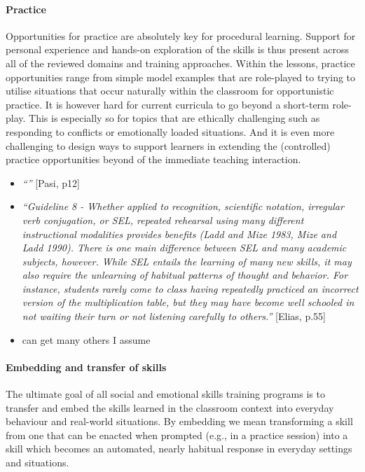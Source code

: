 \documentclass[prodmode,acmtochi]{acmsmall}
\newcommand{\qq}[2]{\textrm{\textit{``#2''}}{ [#1]}}
\begin{document}
\paragraph{Practice} Opportunities for practice are absolutely key for procedural learning. Support for personal experience and hands-on exploration of the skills is thus present across all of the reviewed domains and training approaches. Within the lessons, practice opportunities range from simple model examples that are role-played to trying to utilise situations that occur naturally within the classroom for opportunistic practice. It is however hard for current curricula to go beyond a short-term role-play. This is especially so for topics that are ethically challenging such as responding to conflicts or emotionally loaded situations. And it is even more challenging to design ways to support learners in extending the (controlled) practice opportunities beyond of the immediate teaching interaction.
\begin{itemize}
	\item \qq{Pasi, p12}{}
	\item \qq{Elias, p.55}{Guideline 8 - Whether applied to recognition, scientific notation, irregular verb conjugation, or SEL, repeated rehearsal using many different instructional modalities provides benefits (Ladd and Mize 1983, Mize and Ladd 1990). There is one main difference between SEL and many academic subjects, however. While SEL entails the learning of many new skills, it may also require the unlearning of habitual patterns of thought and behavior. For instance, students rarely come to class having repeatedly practiced an incorrect version of the multiplication table, but they may have become well schooled in not waiting their turn or not listening carefully to others.}
	\item can get many others I assume 
\end{itemize}

         
\paragraph{Embedding and transfer of skills} The ultimate goal of all social and emotional skills training programs is to transfer and embed the skills learned in the classroom context into everyday behaviour and real-world situations. By embedding we mean transforming a skill from one that can be enacted when prompted (e.g., in a practice session) into a skill which becomes an automated, nearly habitual response  in everyday settings and situations.  
\end{document}
